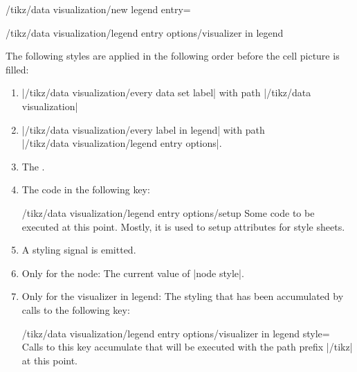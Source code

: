 \begin{key}{/tikz/data visualization/new legend entry=}
\begin{itemize}
\begin{key}{/tikz/data visualization/legend entry options/visualizer in legend}
            \end{key}
    \end{itemize}
    The following styles are applied in the following order before the cell
    picture is filled:
    \begin{enumerate}
        \item |/tikz/data visualization/every data set label| with path
            |/tikz/data visualization|
        \item |/tikz/data visualization/every label in legend| with path\\
            |/tikz/data visualization/legend entry options|.
        \item The .
        \item The code in the following key:
            \begin{key}{/tikz/data visualization/legend entry options/setup}
                Some code to be executed at this point. Mostly, it is used to
                setup attributes for style sheets.
            \end{key}
        \item A styling signal is emitted.
        \item Only for the node: The current value of |node style|.
        \item Only for the visualizer in legend: The styling that has been
            accumulated by calls to the following key:
            \begin{stylekey}{/tikz/data visualization/legend entry options/visualizer in legend style=\\}
                Calls to this key accumulate  that will be
                executed with the path prefix |/tikz| at this point.
            \end{stylekey}
    \end{enumerate}
\end{key}

